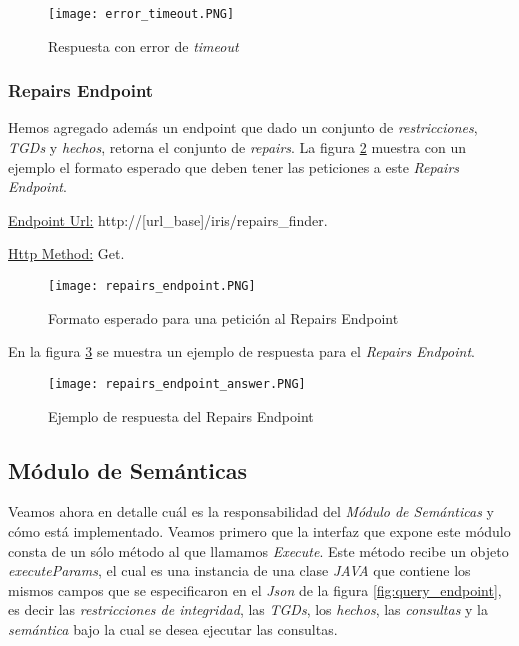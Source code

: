 \documentclass[11pt,a4paper,twoside]{tesis}
\begin{document}
\begin{figure}[ht]
    \texttt{[image: error\_timeout.PNG]}
    \centering
    \caption{Respuesta con error de \textit{timeout}}
    \label{fig:query_endpoint_answer_timeout}
\end{figure}

\subsubsection{Repairs Endpoint}

Hemos agregado además un endpoint que dado un conjunto de \textit{restricciones}, \textit{TGDs} y \textit{hechos}, retorna el conjunto de \textit{repairs}. La figura \ref{fig:repairs_endpoint} muestra con un ejemplo el formato esperado que deben tener las peticiones a este \textit{Repairs Endpoint}.

\underline{Endpoint Url:} http://[url\_base]/iris/repairs\_finder.

\underline{Http Method:} Get.

\begin{figure}[ht]
    \texttt{[image: repairs\_endpoint.PNG]}
    \centering
    \caption{Formato esperado para una petición al Repairs Endpoint}
    \label{fig:repairs_endpoint}
\end{figure}

En la figura \ref{fig:repairs_endpoint_answer} se muestra un ejemplo de respuesta para el \textit{Repairs Endpoint}.
\begin{figure}[ht]
    \texttt{[image: repairs\_endpoint\_answer.PNG]}
    \centering
    \caption{Ejemplo de respuesta del Repairs Endpoint}
    \label{fig:repairs_endpoint_answer}
\end{figure}
\subsection{Módulo de Semánticas}

Veamos ahora en detalle cuál es la responsabilidad del \textit{Módulo de Semánticas} y cómo está implementado. Veamos primero que la interfaz que expone este módulo consta de un sólo método al que llamamos \textit{Execute}. Este método recibe un objeto \textit{executeParams}, el cual es una instancia de una clase \textit{JAVA} que contiene los mismos campos que se especificaron en el \textit{Json} de la figura \ref{fig:query_endpoint}, es decir las \textit{restricciones de integridad}, las \textit{TGDs}, los \textit{hechos}, las \textit{consultas} y la \textit{semántica} bajo la cual se desea ejecutar las consultas.
\end{document}
